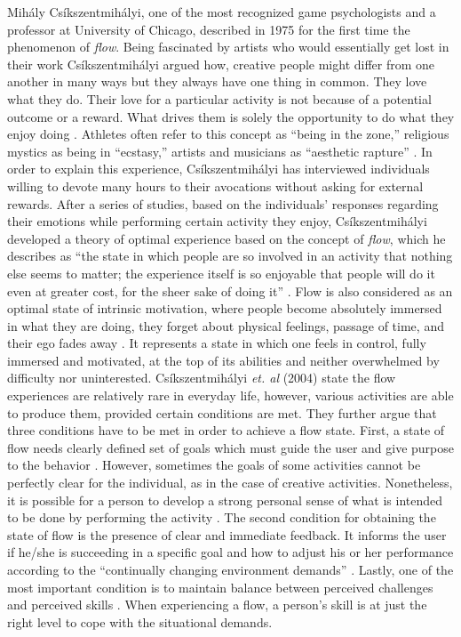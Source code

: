 Mih\'{a}ly Cs\'{i}kszentmih\'{a}lyi, one of the most recognized game psychologists and a professor at University of Chicago, described in 1975 for the first time the phenomenon of \textit{flow}. Being fascinated by artists who would essentially get lost in their work Cs\'{i}kszentmih\'{a}lyi argued how, creative people might differ from one another in many ways but they always have one thing in common. They love what they do. Their love for a particular activity is not because of a potential outcome or a reward. What drives them is solely the opportunity to do what they enjoy doing \cite{csikszentmihalyi1996flow}. Athletes often refer to this concept as ``being in the zone,'' religious mystics
as being in ``ecstasy,'' artists and musicians as ``aesthetic rapture'' \cite{csikszentmihalyi1997finding}. In order to explain this experience, Cs\'{i}kszentmih\'{a}lyi has interviewed individuals willing to devote many hours to their avocations without asking for external rewards. After a series of studies, based on the individuals' responses regarding their emotions while performing certain activity they enjoy, Cs\'{i}kszentmih\'{a}lyi  developed a theory of optimal experience based on the concept of \textit{flow}, which he describes as 
``the state in which people are so involved in an activity that nothing else seems to matter; the experience itself is so enjoyable that people will do it even at greater cost, for the sheer sake of doing it'' \cite{flow1990psychology}. Flow is also considered as an optimal state of intrinsic motivation, where people become absolutely immersed in what they are doing, they forget about physical feelings, passage of time, and their ego fades away \cite{lithiumGamification}. 
It represents a state in which one feels in control, fully immersed and motivated, at the top of its abilities and neither overwhelmed by difficulty nor uninterested. Cs\'{i}kszentmih\'{a}lyi \textit{et. al} (2004) state the flow experiences are relatively rare in everyday
life, however, various activities are able to produce them,
provided certain conditions are met. They further argue that three conditions have to be met in order to achieve a flow state. First, a state of flow needs clearly defined set of goals which must guide the user and give purpose to the behavior \cite{csikszentmihalyi2014flow}. However, sometimes the goals of some activities cannot be perfectly clear for the individual, as in the case of creative activities. Nonetheless, it is possible for a person to develop a strong personal sense of what is intended to be done by performing the activity \cite{kiili2006evaluations}. The second condition for obtaining the state of flow is the presence  of clear and immediate feedback. It informs the user if he/she is succeeding in a specific goal and how to adjust his or her performance according to the ``continually  changing environment demands'' \cite{csikszentmihalyi2014flow}. Lastly, one of the most important condition is to maintain balance between perceived challenges and perceived skills \cite{csikszentmihalyi2014flow}. When experiencing a flow, a person's skill is at just the right level to cope with the situational demands.
